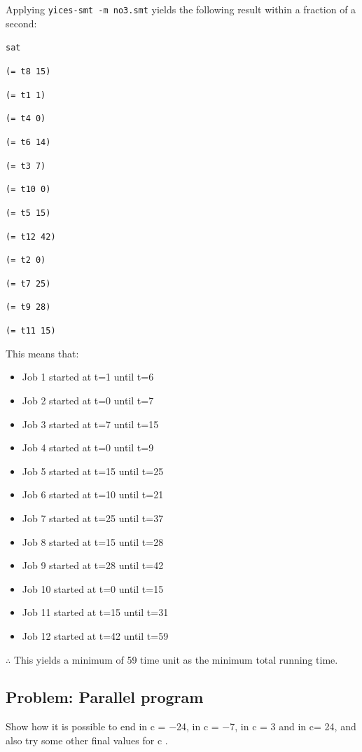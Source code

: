 \documentclass[12pt]{article}
\begin{document}
Applying {\tt yices-smt -m no3.smt} yields the following result
within a fraction of a second: 

{\footnotesize
{\tt sat }

{\tt  }

{\tt (= t8 15) }

{\tt (= t1 1) }

{\tt (= t4 0) }

{\tt (= t6 14) }

{\tt (= t3 7) }

{\tt (= t10 0) }

{\tt (= t5 15) }

{\tt (= t12 42) }

{\tt (= t2 0) }

{\tt (= t7 25) }

{\tt (= t9 28) }

{\tt (= t11 15) }

{\tt  }
}

This means that: 
\begin{itemize}
	\item Job 1 started at t=1 until t=6 
	\item Job 2 started at t=0 until t=7
	\item Job 3 started at t=7 until t=15
	\item Job 4 started at t=0 until t=9
	\item Job 5 started at t=15 until t=25
	\item Job 6 started at t=10 until t=21
	\item Job 7 started at t=25 until t=37
	\item Job 8 started at t=15 until t=28
	\item Job 9 started at t=28 until t=42
	\item Job 10 started at t=0 until t=15
	\item Job 11 started at t=15 until t=31
	\item Job 12 started at t=42 until t=59
\end{itemize}
$\therefore$ This yields a minimum of 59 time unit as the minimum total running time.


\pagebreak

\subsection*{Problem: Parallel program}
 Show how it is possible to end in c = −24, in c = −7, in c = 3 and in c= 24, and also try some other final values for c
 .
\end{document}
